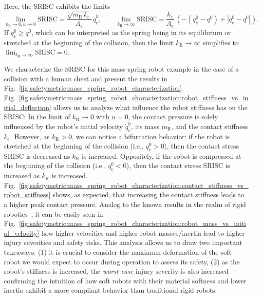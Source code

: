 Here, the \gls{SRISC} exhibits the limits
\begin{equation}
    \lim_{k_\mathrm{R} \to 0, u \to 0} \mathrm{SRISC} = \frac{\sqrt{m_\mathrm{R} \, k_\mathrm{c}}}{A_\mathrm{c}} \, \dot{q}_\mathrm{c}^0,
    \qquad
    \lim_{k_\mathrm{R} \to \infty} \mathrm{SRISC} = \frac{k_\mathrm{c}}{A_\mathrm{c}} \, \left ( - (q_{\mathrm{c}}^0 - q^0 ) + \left | q_{\mathrm{c}}^0 - q^0 \right | \right ).
\end{equation}
If $q_{\mathrm{c}}^0 \geq q^0$, which can be interpreted as the spring being in its equilibrium or stretched at the beginning of the collision, then the limit $k_\mathrm{R} \to \infty$ simplifies to $\lim_{k_\mathrm{R} \to \infty} \mathrm{SRISC} = 0$.

We characterize the \gls{SRISC} for this mass-spring robot example in the case of a collision with a human chest and present the results in Fig.~\ref{fig:safetymetric:mass_spring_robot_characterization}. 
Fig.~\ref{fig:safetymetric:mass_spring_robot_characterization:robot_stiffness_vs_initial_deflection} allows us to analyze what influence the robot stiffness has on the \gls{SRISC}: In the limit of $k_\mathrm{R} \to 0$ with $u = 0$, the contact pressure is solely influenced by the robot's initial velocity $\dot{q}_\mathrm{c}^0$, its mass $m_\mathrm{R}$, and the contact stiffness $k_\mathrm{c}$. However, as $k_\mathrm{R} > 0$, we can notice a bifurcation behavior: if the robot is stretched at the beginning of the collision (i.e., $q_\mathrm{c}^0 > 0$), then the contact stress \gls{SRISC} is decreased as $k_\mathrm{R}$ is increased. Oppositely, if the robot is compressed at the beginning of the collision (i.e., $q_\mathrm{c}^0 < 0$), then the contact stress \gls{SRISC} is increased as $k_\mathrm{R}$ is increased.
Fig.~\ref{fig:safetymetric:mass_spring_robot_characterization:contact_stiffness_vs_robot_stiffness} shows, as expected, that increasing the contact stiffness leads to a higher peak contact pressure.
Analog to the known results in the realm of rigid robotics~\citep{haddadin2009requirements, haddadin2013towards}, it can be easily seen in Fig.~\ref{fig:safetymetric:mass_spring_robot_characterization:robot_mass_vs_initial_velocity} how higher velocities and higher robot masses/inertia lead to higher injury severities and safety risks.
This analysis allows us to draw two important takeaways: (1) it is crucial to consider the maximum deformation of the soft robot we would expect to occur during operation to assess its safety, (2) as the robot's stiffness is increased, the \emph{worst-case} injury severity is also increased~\citep{abidi2017intrinsic} - confirming the intuition of how soft robots with their material softness and lower inertia exhibit a more compliant behavior than traditional rigid robots.

